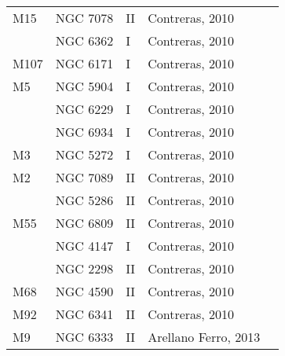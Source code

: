 \documentclass[]{article}
\begin{document}
\begin{longtable}{
	p{1.5cm}|
	p{2.5cm}|
	p{2.5cm}|
	p{3.7cm}|
	p{5.5cm}
	@{}}
		M15            & NGC 7078     & II         & Contreras, 2010      &                                                                        \\
		& NGC 6362     & I          & Contreras, 2010      &                                                                        \\
		M107           & NGC 6171     & I          & Contreras, 2010      &                                                                        \\
		M5             & NGC 5904     & I          & Contreras, 2010      &                                                                        \\
		& NGC 6229     & I          & Contreras, 2010      &                                                                        \\
		& NGC 6934     & I          & Contreras, 2010      &                                                                        \\
		M3             & NGC 5272     & I          & Contreras, 2010      &                                                                        \\
		M2             & NGC 7089     & II         & Contreras, 2010      &                                                                        \\
		& NGC 5286     & II         & Contreras, 2010      &                                                                        \\
		M55            & NGC 6809     & II         & Contreras, 2010      &                                                                        \\
		& NGC 4147     & I          & Contreras, 2010      &                                                                        \\
		& NGC 2298     & II         & Contreras, 2010      &                                                                        \\
		M68            & NGC 4590     & II         & Contreras, 2010      &                                                                        \\
		M92            & NGC 6341     & II         & Contreras, 2010      &                                                                        \\
		M9             & NGC 6333     & II         & Arellano Ferro, 2013 \cite{arellano_ferro_2013} &                                                                        \\

\end{longtable}
\end{document}
